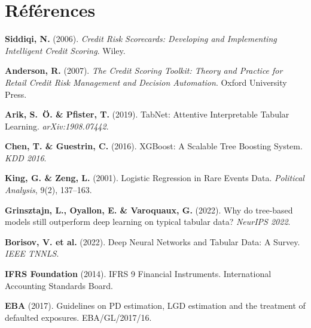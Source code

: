 \documentclass[12pt,a4paper]{article}
\begin{document}
\section{R\'ef\'erences}

\begin{enumerate}[label={[\arabic*]}]
    \item \textbf{Siddiqi, N.} (2006). \textit{Credit Risk Scorecards: Developing and Implementing Intelligent Credit Scoring}. Wiley.

    \item \textbf{Anderson, R.} (2007). \textit{The Credit Scoring Toolkit: Theory and Practice for Retail Credit Risk Management and Decision Automation}. Oxford University Press.

    \item \textbf{Arik, S.~\"O. \& Pfister, T.} (2019). TabNet: Attentive Interpretable Tabular Learning. \textit{arXiv:1908.07442}.

    \item \textbf{Chen, T. \& Guestrin, C.} (2016). XGBoost: A Scalable Tree Boosting System. \textit{KDD 2016}.

    \item \textbf{King, G. \& Zeng, L.} (2001). Logistic Regression in Rare Events Data. \textit{Political Analysis}, 9(2), 137--163.

    \item \textbf{Grinsztajn, L., Oyallon, E. \& Varoquaux, G.} (2022). Why do tree-based models still outperform deep learning on typical tabular data? \textit{NeurIPS 2022}.

    \item \textbf{Borisov, V. et al.} (2022). Deep Neural Networks and Tabular Data: A Survey. \textit{IEEE TNNLS}.

    \item \textbf{IFRS Foundation} (2014). IFRS 9 Financial Instruments. International Accounting Standards Board.

    \item \textbf{EBA} (2017). Guidelines on PD estimation, LGD estimation and the treatment of defaulted exposures. EBA/GL/2017/16.
\end{enumerate}
\end{document}
